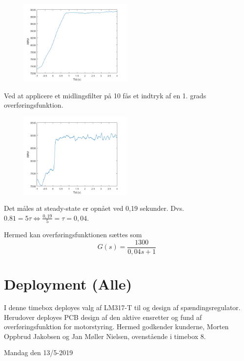 \begin{figure}[h]
  \centering
  \includegraphics[width=0.5\textwidth]{mo4.png}
  \caption{}
  \label{fig:mo4}
\end{figure}

Ved at applicere et midlingsfilter på 10 fås et indtryk af en 1. grads overføringsfunktion.

\begin{figure}[h]
  \centering
  \includegraphics[width=0.5\textwidth]{mo5.png}
  \caption{}
  \label{fig:mo5}
\end{figure}

Det måles at steady-state er opnået ved 0,19 sekunder. Dvs. $0.81 = 5\tau \Leftrightarrow \frac{0,19}{5}=\tau=0,04$.

Hermed kan overføringsfunktionen sættes som
\begin{equation}
  \label{eq:1}
G(s) = \frac{1300}{0,04s+1}  
\end{equation}
\clearpage
\section{Deployment (Alle)}
\label{sec:deployment}
I denne timebox deployes valg af LM317-T til og design af spændingsregulator. Herudover deployes PCB design af den aktive ensretter og fund af overføringsfunktion for motorstyring.
Hermed godkender kunderne, Morten Oppbrud Jakobsen og Jan Møller Nielsen, ovenstående i timebox 8.

Mandag den 13/5-2019

